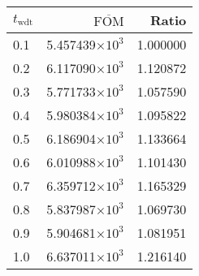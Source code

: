 \begin{tabular}{lrr}
\toprule
$t_{\mathrm{wdt}}$ & $\overline{\mathrm{FOM}}$ &    Ratio \\
\midrule
               0.1 &   5.457439$\times 10^{3}$ & 1.000000 \\
               0.2 &   6.117090$\times 10^{3}$ & 1.120872 \\
               0.3 &   5.771733$\times 10^{3}$ & 1.057590 \\
               0.4 &   5.980384$\times 10^{3}$ & 1.095822 \\
               0.5 &   6.186904$\times 10^{3}$ & 1.133664 \\
               0.6 &   6.010988$\times 10^{3}$ & 1.101430 \\
               0.7 &   6.359712$\times 10^{3}$ & 1.165329 \\
               0.8 &   5.837987$\times 10^{3}$ & 1.069730 \\
               0.9 &   5.904681$\times 10^{3}$ & 1.081951 \\
               1.0 &   6.637011$\times 10^{3}$ & 1.216140 \\
\bottomrule
\end{tabular}
